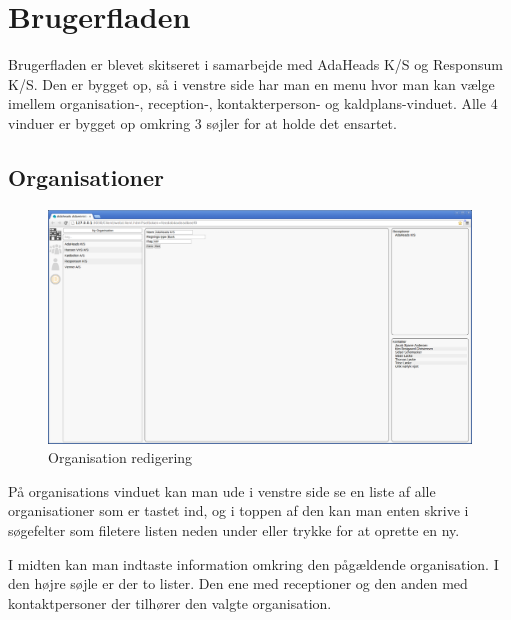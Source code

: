 \pagebreak
\section{Brugerfladen}
Brugerfladen er blevet skitseret i samarbejde med AdaHeads K/S og Responsum K/S.
Den er bygget op, så i venstre side har man en menu hvor man kan vælge imellem organisation-, reception-, kontakterperson- og kaldplans-vinduet. Alle 4 vinduer er bygget op omkring 3 søjler for at holde det ensartet.

\subsection{Organisationer}
\begin{figure}[ht!]
\centering
\includegraphics[width=\textwidth]{images/screen_org.png}
\caption{Organisation redigering}
\label{fig:screenorg}
\end{figure}
På organisations vinduet kan man ude i venstre side se en liste af alle organisationer som er tastet ind, og i toppen af den kan man enten skrive i søgefelter som filetere listen neden under eller trykke for at oprette en ny. 

I midten kan man indtaste information omkring den pågældende organisation. I den højre søjle er der to lister. Den ene med receptioner og den anden med kontaktpersoner der tilhører den valgte organisation.

\pagebreak
